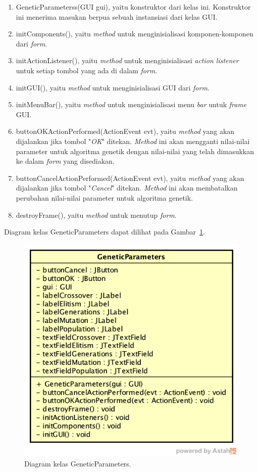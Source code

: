 \begin{enumerate}
\item GeneticParameterss(GUI gui), yaitu konstruktor dari kelas ini. Konstruktor ini menerima masukan berpua sebuah instansiasi dari kelas GUI.
\item initComponents(), yaitu \textit{method} untuk menginisialisasi komponen-komponen dari \textit{form}.
\item initActionListener(), yaitu \textit{method} untuk menginisialisasi \textit{action listener} untuk setiap tombol yang ada di dalam \textit{form}.
\item initGUI(), yaitu \textit{method} untuk menginisialisasi GUI dari \textit{form}.
\item initMenuBar(), yaitu \textit{method} untuk menginisialisasi menu \textit{bar} untuk \textit{frame} GUI.
\item buttonOKActionPerformed(ActionEvent evt), yaitu \textit{method} yang akan dijalankan jika tombol "\textit{OK}" ditekan. \textit{Method} ini akan mengganti nilai-nilai parameter untuk algoritma genetik dengan nilai-nilai yang telah dimasukkan ke dalam \textit{form} yang disediakan.
\item buttonCancelActionPerformed(ActionEvent evt), yaitu \textit{method} yang akan dijalankan jika tombol "\textit{Cancel}" ditekan. \textit{Method} ini akan membatalkan perubahan nilai-nilai parameter untuk algoritma genetik.
\item destroyFrame(), yaitu \textit{method} untuk menutup \textit{form}.
\end{enumerate}

Diagram kelas GeneticParameters dapat dilihat pada Gambar~\ref{fig:diagramkelasgeneticparameters}.

\begin{figure}
\centering
\captionsetup{justification=centering}
\includegraphics[scale=0.5]{Gambar/Perancangan/DiagramKelasGeneticParameters.png}
\caption[Diagram kelas GeneticParameters.]{Diagram kelas GeneticParameters.}
\label{fig:diagramkelasgeneticparameters}
\end{figure}